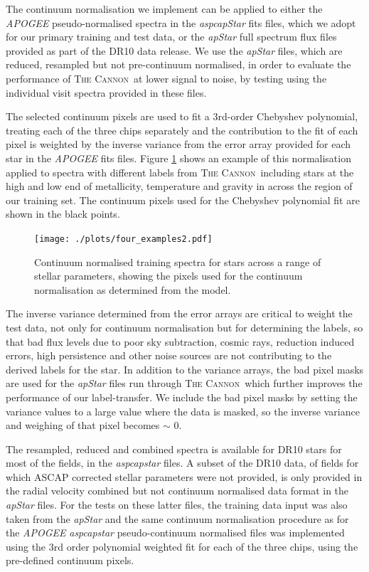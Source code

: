\documentclass[12pt, preprint]{aastex}
\newcommand{\tc}{\textsc{The Cannon}}
\begin{document}
The continuum normalisation we implement can be applied to either the \textit{APOGEE} pseudo-normalised spectra in the \textit{aspcapStar} fits files, which we adopt for our primary training and test data, or the \textit{apStar} full spectrum flux files provided as part of the DR10 data release. We use the \textit{apStar} files, which are reduced, resampled but not pre-continuum normalised, in order to evaluate the performance of \tc\ at lower signal to noise, by testing using the individual visit spectra provided in these files.  

The selected continuum pixels are used to fit a 3rd-order Chebyshev polynomial, treating each of the three chips separately and the contribution to the fit of each pixel is weighted by the inverse variance from the error array provided for each star in the \textit{APOGEE} fits files. Figure \ref{fig:norm} shows an example of this normalisation applied to spectra with different labels from \tc\, including stars at the high and low end of metallicity, temperature and gravity in across the region of our training set. The continuum pixels used for the Chebyshev polynomial fit are shown in the black points. 

%
\begin{figure}[h!]
  \texttt{[image: ./plots/four\_examples2.pdf]}
\caption{Continuum normalised training spectra for stars across a range of stellar parameters, showing the pixels used for the continuum normalisation as determined from the model.}
\label{fig:norm}
\end{figure}


The inverse variance determined from the error arrays are critical to weight the test data, not only for continuum normalisation but for determining the labels, so that bad flux levels due to poor sky subtraction, cosmic rays, reduction induced errors, high persistence and other noise sources are not contributing to the derived labels for the star. In addition to the variance arrays, the bad pixel masks are used for the \textit{apStar} files run through \tc\, which further improves the performance of our label-transfer. We include the bad pixel masks by setting the variance values to a large value where the data is masked, so the inverse variance and weighing of that pixel becomes $\sim$ 0. 

The resampled, reduced and combined spectra is available for DR10 stars for most of the fields, in the \textit{aspcapstar} files. A subset of the DR10 data, of fields for which ASCAP corrected stellar parameters were not provided, is only provided in the radial velocity combined but not continuum normalised data format in the \textit{apStar} files. For the tests on these latter files, the training data input was also taken from the \textit{apStar} and the same continuum normalisation procedure as for the \textit{APOGEE} \textit{aspcapstar} pseudo-continuum normalised files was implemented using the 3rd order polynomial weighted fit for each of the three chips, using the pre-defined continuum pixels.
\end{document}
